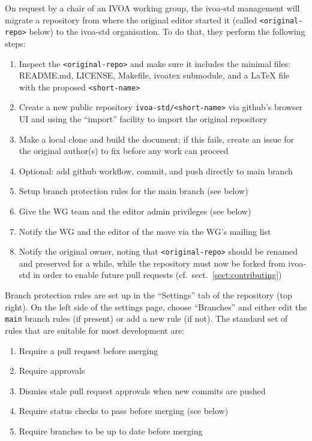 \documentclass[11pt,a4paper]{ivoa}
\begin{document}
On request by a chair of an IVOA working group, the ivoa-std management
will migrate a repository from where the original editor started it
(called \verb|<original-repo>| below) to the ivoa-std organisation.  To
do that, they perform the following steps:

\begin{enumerate}
\item Inspect the \verb|<original-repo>| and make sure it includes the minimal
files: README.md, LICENSE, Makefile, ivoatex submodule, and a LaTeX
file with the proposed \verb|<short-name>|
\item Create a new public repository \verb|ivoa-std/<short-name>| via github's
browser UI and using the ``import'' facility to import the
original repository
\item Make a local clone and build the document; if this fails, create an issue
for the original author(s) to fix before any work can proceed
\item Optional: add github workflow, commit, and push directly to main branch
\item Setup branch protection rules for the main branch (see below)
\item Give the WG team and the editor admin privileges (see below)
\item Notify the WG and the editor of the move via the WG's mailing list
\item Notify the original owner, noting that \verb|<original-repo>|
should be renamed and preserved for a while, while the repository must
now be forked from ivoa-std in order to enable future pull requests
(cf.~sect.~\ref{sect:contributing})
\end{enumerate}

Branch protection rules are set up in the ``Settings'' tab of the repository (top right).
On the left side of the settings page, choose ``Branches'' and either edit the \verb|main|
branch rules (if present) or add a new rule (if not). The standard set of rules that are
suitable for most development are:

\begin{enumerate}
\item Require a pull request before merging
\item Require approvals
\item Dismiss stale pull request approvals when new commits are pushed
\item Require status checks to pass before merging (see below)
\item Require branches to be up to date before merging
\end{enumerate}
\end{document}
